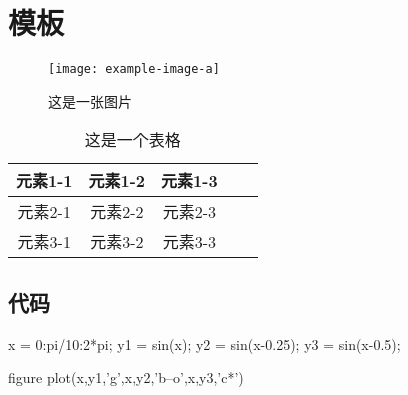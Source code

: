 \documentclass{cumcmthesis}
\begin{document}
\maketitle

\begin{abstract}
  \zhlipsum[1]
\end{abstract}

\newpage

\section{模板}

\begin{figure}[h]
  \centering
  \texttt{[image: example-image-a]}
  \caption{这是一张图片}\label{fig1}
\end{figure}

\begin{table}[h]
  \centering
  \caption{这是一个表格}\label{tab1}
  \begin{tabular}{ccccc}
    \toprule
    元素1-1 & 元素1-2 & 元素1-3\\
    \midrule
    元素2-1 & 元素2-2 & 元素2-3\\
    元素3-1 & 元素3-2 & 元素3-3\\
    \bottomrule
  \end{tabular}
  
\end{table}
\subsection{代码}
\begin{matlab}
  x = 0:pi/10:2*pi;
  y1 = sin(x);
  y2 = sin(x-0.25);
  y3 = sin(x-0.5);

  figure
  plot(x,y1,'g',x,y2,'b--o',x,y3,'c*')
\end{matlab}
\end{document}
